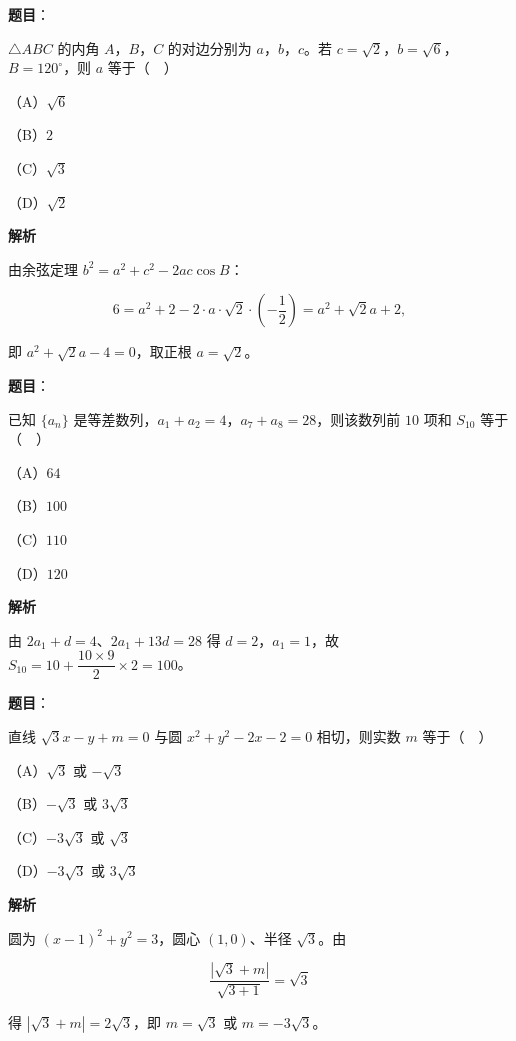 \begin{answer}

\textbf{题目}：

$\triangle ABC$ 的内角 $A$，$B$，$C$ 的对边分别为 $a$，$b$，$c$。若 $c=\sqrt2$，$b=\sqrt6$，$B=120^\circ$，则 $a$ 等于（　）

（A）$\sqrt6$

（B）$2$

（C）$\sqrt3$

（D）$\sqrt2$

\textbf{解析}

由余弦定理 $b^2=a^2+c^2-2ac\cos B$：

\nopagebreak[4]
\[6=a^2+2-2\cdot a\cdot\sqrt2\cdot\left(-\frac12\right)=a^2+\sqrt2a+2,\]

即 $a^2+\sqrt2a-4=0$，取正根 $a=\sqrt2$。


\end{answer}
\begin{answer}

\textbf{题目}：

已知 $\{a_n\}$ 是等差数列，$a_1+a_2=4$，$a_7+a_8=28$，则该数列前 $10$ 项和 $S_{10}$ 等于（　）

（A）$64$

（B）$100$

（C）$110$

（D）$120$

\textbf{解析}

由 $2a_1+d=4$、$2a_1+13d=28$ 得 $d=2$，$a_1=1$，故 $S_{10}=10+\dfrac{10\times9}2\times2=100$。


\end{answer}
\begin{answer}

\textbf{题目}：

直线 $\sqrt3x-y+m=0$ 与圆 $x^2+y^2-2x-2=0$ 相切，则实数 $m$ 等于（　）

（A）$\sqrt3$ 或 $-\sqrt3$

（B）$-\sqrt3$ 或 $3\sqrt3$

（C）$-3\sqrt3$ 或 $\sqrt3$

（D）$-3\sqrt3$ 或 $3\sqrt3$

\textbf{解析}

圆为 $(x-1)^2+y^2=3$，圆心 $(1,0)$、半径 $\sqrt3$。由

\nopagebreak[4]
\[\frac{|\sqrt3+m|}{\sqrt{3+1}}=\sqrt3\]

得 $|\sqrt3+m|=2\sqrt3$，即 $m=\sqrt3$ 或 $m=-3\sqrt3$。


\end{answer}
